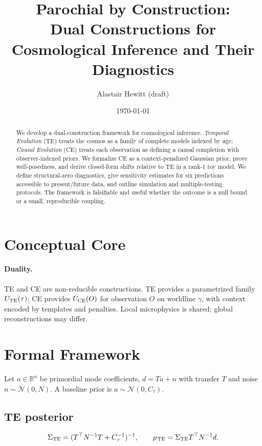 \documentclass[11pt]{article}
\title{Parochial by Construction:\\
Dual Constructions for Cosmological Inference and Their Diagnostics}
\author{Alastair Hewitt (draft)}
\date{\today}
\begin{document}
\maketitle

\begin{abstract}
We develop a dual-construction framework for cosmological inference. \emph{Temporal Evolution} (TE) treats the cosmos as a family of complete models indexed by age; \emph{Causal Evolution} (CE) treats each observation as defining a causal completion with observer-indexed priors. We formalize CE as a context-penalized Gaussian prior, prove well-posedness, and derive closed-form shifts relative to TE in a rank-1 toy model. We define structural-zero diagnostics, give sensitivity estimates for six predictions accessible to present/future data, and outline simulation and multiple-testing protocols. The framework is falsifiable and useful whether the outcome is a null bound or a small, reproducible coupling.
\end{abstract}

\tableofcontents

\section{Conceptual Core}
\paragraph{Duality.} TE and CE are non-reducible constructions. TE provides a parametrized family $U_{\rm TE}(\tau)$; CE provides $U_{\rm CE}(O)$ for observation $O$ on worldline $\gamma$, with context encoded by templates and penalties. Local microphysics is shared; global reconstructions may differ.

\section{Formal Framework}
Let $a\in\mathbb R^n$ be primordial mode coefficients, $d=Ta+n$ with transfer $T$ and noise $n\sim\mathcal N(0,N)$. A baseline prior is $a\sim\mathcal N(0,C_\tau)$.

\subsection{TE posterior}
\begin{equation}
\Sigma_{\rm TE}=(T^\top N^{-1}T+C_\tau^{-1})^{-1},\qquad
\mu_{\rm TE}=\Sigma_{\rm TE}T^\top N^{-1}d.
\end{equation}
\end{document}

